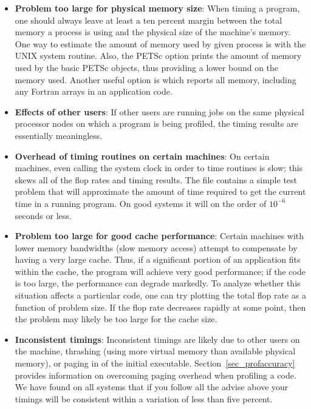 {{{\begin{itemize}
\item {\bf Problem too large for physical memory size}: When timing a program, one
      should always leave at least a ten percent margin between the total
      memory a process is using and the physical size of
      the machine's memory. One way to estimate the amount of
      memory used by given process is with the UNIX  system routine.
      Also, the PETSc option  prints the amount of
      memory used by the basic PETSc objects, thus providing a lower
      bound on the memory used.  Another useful option is 
      which reports all memory, including any Fortran arrays in an
      application code.
\item {\bf Effects of other users}:  If other users are running
      jobs on the same physical processor nodes on which a program is being profiled,
      the timing results are essentially meaningless.
\item {\bf Overhead of timing routines on certain machines}: On certain machines,
      even calling the system clock in order to time routines is
      slow; this skews all of the flop rates and timing results. The file
      \href{http://www.mcs.anl.gov/petsc/petsc-current/src/benchmarks/PetscTime.c.html}{} contains a 
      simple test problem that will approximate the amount of time
      required to get the current time in a running program. On good
      systems it will on the order of $10^{-6}$ seconds or less.
\item {\bf Problem too large for good cache performance}: Certain machines
      with lower memory bandwidths (slow memory access) attempt to
      compensate by having a very large cache.  Thus, if a significant
      portion of an application fits within the cache, the program will achieve very
      good performance; if the code is too large, the performance can degrade markedly.
      To analyze whether this situation affects a particular code, one can
      try plotting the total flop rate as a function of problem
      size.  If the flop rate decreases rapidly at some point, then the
      problem may likely be too large for the cache size.
\item {\bf Inconsistent timings}:  Inconsistent timings are likely due to other
      users on the machine, thrashing (using more virtual memory than available
      physical memory), or paging in of the initial executable.
      Section~\ref{sec_profaccuracy} provides information on overcoming paging
      overhead when profiling a code. We have found on all systems that if you
      follow all the advise above your timings will be consistent within a variation
      of less than five percent.
\end{itemize}

}}}
